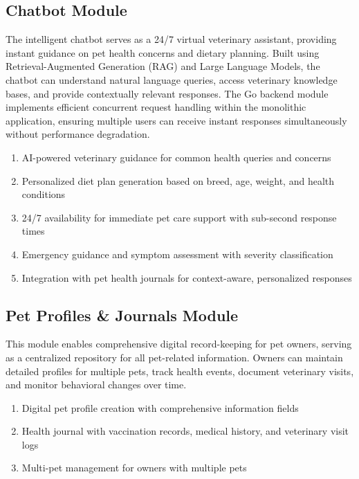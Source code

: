 \subsection{Chatbot Module}
The intelligent chatbot serves as a 24/7 virtual veterinary assistant, providing instant guidance on pet health concerns and dietary planning. Built using Retrieval-Augmented Generation (RAG) and Large Language Models, the chatbot can understand natural language queries, access veterinary knowledge bases, and provide contextually relevant responses. The Go backend module implements efficient concurrent request handling within the monolithic application, ensuring multiple users can receive instant responses simultaneously without performance degradation.
\begin{enumerate}
    \item AI-powered veterinary guidance for common health queries and concerns
    \item Personalized diet plan generation based on breed, age, weight, and health conditions
    \item 24/7 availability for immediate pet care support with sub-second response times
    \item Emergency guidance and symptom assessment with severity classification
    \item Integration with pet health journals for context-aware, personalized responses

\end{enumerate}

\subsection{Pet Profiles \& Journals Module}
This module enables comprehensive digital record-keeping for pet owners, serving as a centralized repository for all pet-related information. Owners can maintain detailed profiles for multiple pets, track health events, document veterinary visits, and monitor behavioral changes over time. 
\begin{enumerate}
    \item Digital pet profile creation with comprehensive information fields 
    \item Health journal with vaccination records, medical history, and veterinary visit logs
    
    \item Multi-pet management for owners with multiple pets
\end{enumerate}

